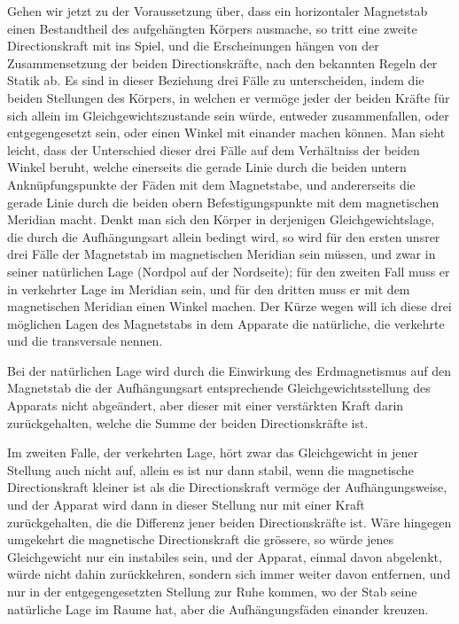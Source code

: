 Gehen wir jetzt zu der Voraussetzung über, dass ein horizontaler Magnetstab einen Bestandtheil des aufgehängten Körpers ausmache, so tritt eine zweite Directionskraft mit ins Spiel, und die Erscheinungen hängen von der Zusammensetzung der beiden Directionskräfte, nach den bekannten Regeln der Statik ab. Es sind in dieser Beziehung drei Fälle zu unterscheiden, indem die beiden Stellungen des Körpers, in welchen er vermöge jeder der beiden Kräfte für sich allein im Gleichgewichtszustande sein würde, entweder zusammenfallen, oder entgegengesetzt sein, oder einen Winkel mit einander machen können. Man sieht leicht, dass der Unterschied dieser drei Fälle auf dem Verhältniss der beiden Winkel beruht, welche einerseits die gerade Linie durch die beiden untern Anknüpfungspunkte der Fäden mit dem Magnetstabe, und andererseits die gerade Linie durch die beiden obern Befestigungspunkte mit dem magnetischen Meridian macht. Denkt man sich den Körper in derjenigen Gleichgewichtslage, die durch die Aufhängungsart allein bedingt wird, so wird für den ersten unsrer drei Fälle der Magnetstab im magnetischen Meridian sein müssen, und zwar in seiner natürlichen Lage (Nordpol auf der Nordseite); für den zweiten Fall muss er in verkehrter Lage im Meridian sein, und für den dritten muss er mit dem magnetischen Meridian einen Winkel machen. Der Kürze wegen will ich diese drei möglichen Lagen des Magnetstabs in dem Apparate die natürliche, die verkehrte und die transversale nennen.

Bei der natürlichen Lage wird durch die Einwirkung des Erdmagnetismus auf den Magnetstab die der Aufhängungsart entsprechende Gleichgewichtsstellung des Apparats nicht abgeändert, aber dieser mit einer verstärkten Kraft darin zurückgehalten, welche die Summe der beiden Directionskräfte ist.

Im zweiten Falle, der verkehrten Lage, hört zwar das Gleichgewicht in jener Stellung auch nicht auf, allein es ist nur dann stabil, wenn die magnetische Directionskraft kleiner ist als die Directionskraft vermöge der Aufhängungsweise, und der Apparat wird dann in dieser Stellung nur mit einer Kraft zurückgehalten, die die Differenz jener beiden Directionskräfte ist. Wäre hingegen umgekehrt die magnetische Directionskraft die grössere, so würde jenes Gleichgewicht nur ein instabiles sein, und der Apparat, einmal davon abgelenkt, würde nicht dahin zurückkehren, sondern sich immer weiter davon entfernen, und nur in der entgegengesetzten Stellung zur Ruhe kommen, wo der Stab seine natürliche Lage im Raume hat, aber die Aufhängungsfäden einander kreuzen.

